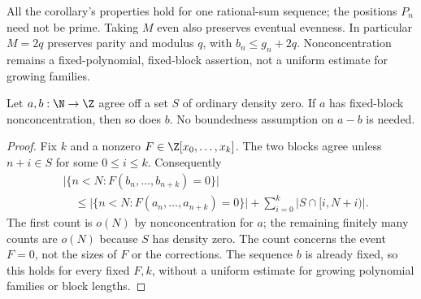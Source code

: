 All the corollary's properties hold for one rational-sum sequence; the
positions $P_n$ need not be prime.  Taking $M$ even also preserves eventual
evenness.  In particular $M=2q$ preserves parity and modulus $q$, with
$b_n\le g_n+2q$.  Nonconcentration remains a fixed-polynomial, fixed-block
assertion, not a uniform estimate for growing families.

\begin{proposition}\label{long251:res:sparse-nonconcentration}
Let $a,b:\N\to\Z$ agree off a set $S$ of ordinary density zero.
If $a$ has fixed-block nonconcentration, then so does $b$.
No boundedness assumption on $a-b$ is needed.
\end{proposition}
\begin{proof}
Fix $k$ and a nonzero $F\in\Z[x_0,\ldots,x_k]$.  The two blocks agree
unless $n+i\in S$ for some $0\le i\le k$.  Consequently
\[
 \begin{aligned}
 &\bigl|\{n<N:F(b_n,\ldots,b_{n+k})=0\}\bigr|\\
 &\quad\le\bigl|\{n<N:F(a_n,\ldots,a_{n+k})=0\}\bigr|
       +\sum_{i=0}^k|S\cap[i,N+i)|.
 \end{aligned}
\]
The first count is $o(N)$ by nonconcentration for $a$; the remaining
finitely many counts are $o(N)$ because $S$ has density zero.
The count concerns the event $F=0$, not the sizes of $F$ or the
corrections.  The sequence $b$ is already fixed, so this holds for
every fixed $F,k$, without a uniform estimate for growing polynomial
families or block lengths.
\end{proof}

